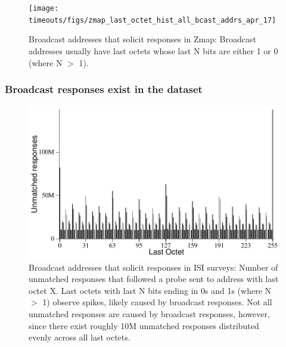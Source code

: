 \begin{figure}[t]
\begin{center}
\texttt{[image: timeouts/figs/zmap\_last\_octet\_hist\_all\_bcast\_addrs\_apr\_17]}
\end{center}
\caption[Broadcast addresses that solicit responses in Zmap scans]{\label{fig:zmap_last_octet_hist}%
Broadcast addresses that solicit responses in Zmap: Broadcast addresses usually
have last octets whose last N bits are either 1 or 0
(where N $>$ 1).
}
\end{figure}


\subsubsection*{Broadcast responses exist in the dataset}

%
\begin{figure}[t]
\begin{center}
\includegraphics[width=.90\linewidth]{timeouts/figs/last_octet_hist}
\end{center}
\caption[Broadcast addresses that solicit responses in ISI surveys]{\label{fig:bcast_hist}%
Broadcast addresses that solicit responses in ISI surveys: Number of unmatched responses that followed a probe sent to address
with last octet X. Last octets with last N bits ending in
0s and 1s (where N $>$ 1) observe spikes, likely caused by broadcast
responses. Not all unmatched responses are caused by broadcast
responses, however, since there exist roughly 10M unmatched
responses distributed evenly across all last octets.}
\end{figure}



